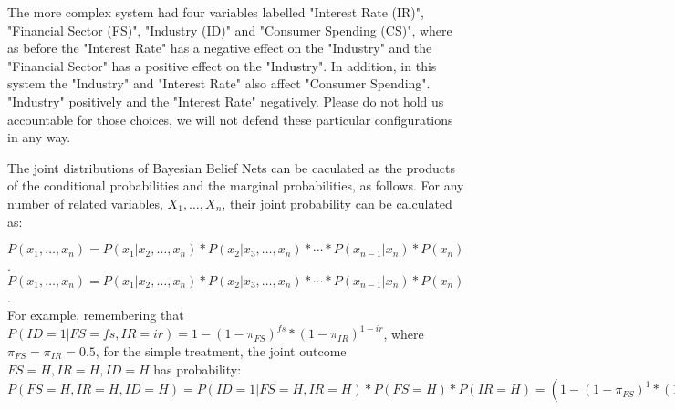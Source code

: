 The more complex system had four variables labelled "Interest Rate (IR)", "Financial Sector (FS)", "Industry (ID)" and "Consumer Spending (CS)", where as before the "Interest Rate" has a negative effect on the "Industry" and the "Financial Sector" has a positive effect on the "Industry". In addition, in this system the "Industry" and "Interest Rate" also affect "Consumer Spending". "Industry" positively and the "Interest Rate" negatively.  Please do not hold us accountable for those choices, we will not defend these particular configurations in any way.

The joint distributions of Bayesian Belief Nets can be caculated as the products of the conditional probabilities and the marginal probabilities, as follows. For any number of related variables, $X_1, \ldots, X_n$, their joint probability can be calculated as:

$P(x_1, \ldots, x_n) = P(x_1 | x_2, \ldots, x_n)*P(x_2 | x_3, \ldots, x_n)*\cdots*P(x_{n-1} |x_n)*P(x_n)$.
\\

$P(x_1, \ldots, x_n) = P(x_1 | x_2, \ldots, x_n)*P(x_2 | x_3, \ldots, x_n)*\cdots*P(x_{n-1} |x_n)*P(x_n)$.
\\

For example, remembering that $P(ID=1|FS=fs, IR=ir) = 1-(1-\pi_{FS})^{fs}*(1-\pi_{IR})^{1-ir}$, where $\pi_{FS}=\pi_{IR}=0.5$, for the simple treatment, the joint outcome $FS=H, IR=H, ID=H$ has probability:
\\

$P(FS=H, IR=H, ID=H) = P(ID=1|FS=H, IR=H)*P(FS=H)*P(IR=H)=\left(1-(1-\pi_{FS})^{1}*(1-\pi_{IR})^{1-1}\right)*0.5^2 =0.125.$  
\\

